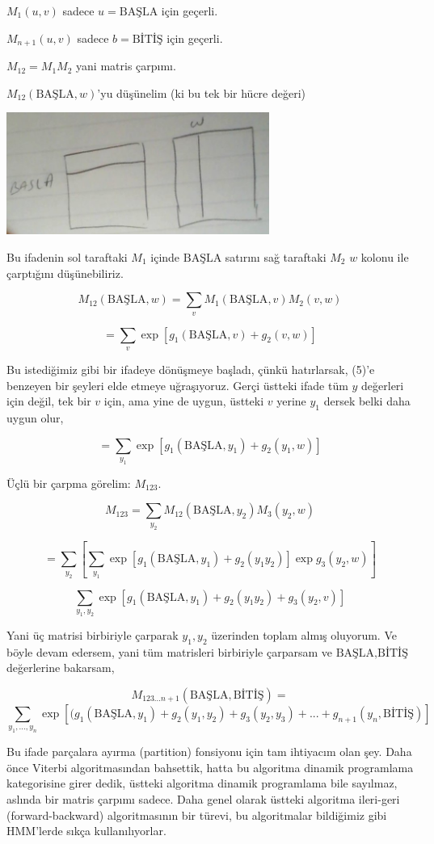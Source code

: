 \documentclass[12pt,fleqn]{article}\usepackage{../../common}
\begin{document}
$M_1(u,v)$ sadece $u=\textrm{BAŞLA}$ için geçerli. 

$M_{n+1}(u,v)$ sadece $b=\textrm{BİTİŞ}$ için geçerli. 

$M_{12} = M_1M_2$ yani matris çarpımı. 

$M_{12}(\textrm{BAŞLA},w)$'yu düşünelim (ki bu tek bir hücre değeri) 

\includegraphics[height=4cm]{crf_3.jpg}

Bu ifadenin sol taraftaki $M_1$ içinde $\textrm{BAŞLA}$ satırını sağ taraftaki $M_2$
$w$ kolonu ile çarptığını düşünebiliriz.

$$M_{12}(\textrm{BAŞLA},w) = \sum_v M_1(\textrm{BAŞLA}, v)M_2(v,w)  $$

$$ = \sum_v \exp [g_1(\textrm{BAŞLA},v) + g_2(v,w)] $$

Bu istediğimiz gibi bir ifadeye dönüşmeye başladı, çünkü hatırlarsak, (5)'e
benzeyen bir şeyleri elde etmeye uğraşıyoruz. Gerçi üstteki ifade tüm $y$
değerleri için değil, tek bir $v$ için, ama yine de uygun, üstteki $v$
yerine $y_1$ dersek belki daha uygun olur,

$$ = \sum_{y_1} \exp [g_1(\textrm{BAŞLA},y_1) + g_2(y_1,w)] $$

Üçlü bir çarpma görelim: $M_{123}$. 

$$ M_{123} = \sum_{y_2} M_{12}(\textrm{BAŞLA}, y_2)M_3(y_2,w)  $$

$$ = \sum_{y_2} [ \sum_{y_1}\exp [g_1(\textrm{BAŞLA},y_1) + g_2(y_1y_2) ] 
\exp g_3(y_2,w) ]
$$

$$ \sum_{y_1,y_2} \exp [g_1(\textrm{BAŞLA},y_1) + g_2(y_1y_2) + g_3(y_2,v)]  $$

Yani üç matrisi birbiriyle çarparak $y_1,y_2$ üzerinden toplam almış
oluyorum. Ve böyle devam edersem, yani tüm matrisleri birbiriyle çarparsam
ve $\textrm{BAŞLA}, \textrm{BİTİŞ}$ değerlerine bakarsam, 

$$ 
M_{123...n+1} (\textrm{BAŞLA}, \textrm{BİTİŞ}) =  
$$
$$
\sum_{y_1,...,y_n}  \exp [
(g_1(\textrm{BAŞLA},y_1) + g_2(y_1,y_2) + g_3(y_2,y_3) + ... + g_{n+1}
(y_n, \textrm{BİTİŞ} )
]
$$

Bu ifade parçalara ayırma (partition) fonsiyonu için tam ihtiyacım olan
şey. Daha önce Viterbi algoritmasından bahsettik, hatta bu algoritma
dinamik programlama kategorisine girer dedik, üstteki algoritma dinamik
programlama bile sayılmaz, aslında bir matris çarpımı sadece. Daha genel
olarak üstteki algoritma ileri-geri (forward-backward) algoritmasının bir
türevi, bu algoritmalar bildiğimiz gibi HMM'lerde sıkça kullanılıyorlar.
\end{document}
